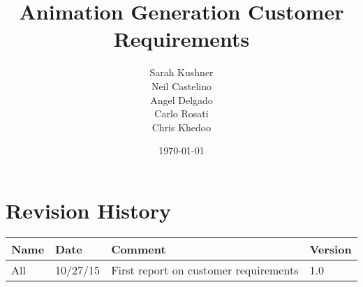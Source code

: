 \documentclass{report}
\begin{document}
\title{Animation Generation Customer Requirements}
\author{Sarah Kushner \\
		Neil Castelino \\
		Angel Delgado \\
		Carlo Rosati \\
		Chris Khedoo}
\date{\today}
\maketitle
\small

\pagebreak
\section{Revision History}
\begin{tabular}{|l|l|l|l|}
\hline
Name	& Date	 		& 	Comment	 								& 	Version	 \\ \hline
All		& 10/27/15		& 	First report on customer requirements	&  	1.0 	 \\ \hline
\end{tabular}

\pagebreak




\end{document}

